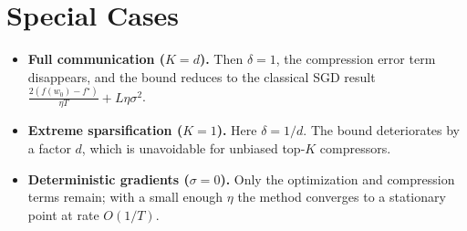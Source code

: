 \documentclass{article}
\begin{document}
\section*{Special Cases}
\begin{itemize}
\item \textbf{Full communication ($K=d$).} Then $\delta=1$, the compression
error term disappears, and the bound reduces to the classical SGD result
$\frac{2(f(w_{0})-f^{\star})}{\eta T}+L\eta\sigma^{2}$.

\item \textbf{Extreme sparsification ($K=1$).} Here $\delta=1/d$.
The bound deteriorates by a factor $d$, which is unavoidable for unbiased
top‑$K$ compressors.

\item \textbf{Deterministic gradients ($\sigma=0$).}
Only the optimization and compression terms remain; with a small enough $\eta$
the method converges to a stationary point at rate $O(1/T)$.
\end{itemize}
\end{document}
